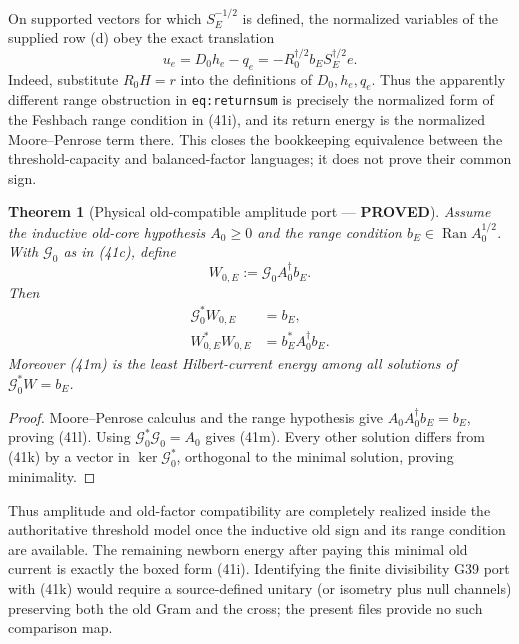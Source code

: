 \documentclass[11pt]{article}
\newtheorem{theorem}{Theorem}
\newcommand{\PROVED}{\textcolor{green!45!black}{\textbf{PROVED}}}
\newcommand{\Ran}{\operatorname{Ran}}
\begin{document}
On supported vectors for which $S_E^{-1/2}$ is defined, the normalized
variables of the supplied row (d) obey the exact translation
\begin{equation}
 u_e=D_0h_e-q_e
 =-R_0^{\dagger/2}b_ES_E^{\dagger/2}e.                \tag{41j}
\end{equation}
Indeed, substitute $R_0H=r$ into the definitions of $D_0,h_e,q_e$.  Thus the
apparently different range obstruction in \texttt{eq:returnsum} is precisely
the normalized form of the Feshbach range condition in (41i), and its return
energy is the normalized Moore--Penrose term there.  This closes the
bookkeeping equivalence between the threshold-capacity and balanced-factor
languages; it does not prove their common sign.

\begin{theorem}[Physical old-compatible amplitude port --- \PROVED]
Assume the inductive old-core hypothesis $A_0\ge0$ and the range condition
$b_E\in\Ran A_0^{1/2}$.  With $\mathcal G_0$ as in (41c), define
\begin{equation}
 W_{0,E}:=\mathcal G_0A_0^\dagger b_E.                 \tag{41k}
\end{equation}
Then
\begin{align}
 \mathcal G_0^*W_{0,E}&=b_E,                           \tag{41l}\\
 W_{0,E}^*W_{0,E}&=b_E^*A_0^\dagger b_E.              \tag{41m}
\end{align}
Moreover (41m) is the least Hilbert-current energy among all solutions of
$\mathcal G_0^*W=b_E$.
\end{theorem}

\begin{proof}
Moore--Penrose calculus and the range hypothesis give
$A_0A_0^\dagger b_E=b_E$, proving (41l).  Using
$\mathcal G_0^*\mathcal G_0=A_0$ gives (41m).  Every other solution differs
from (41k) by a vector in $\ker\mathcal G_0^*$, orthogonal to the minimal
solution, proving minimality.
\end{proof}

Thus amplitude and old-factor compatibility are completely realized inside
the authoritative threshold model once the inductive old sign and its range
condition are available.  The remaining newborn energy after paying this
minimal old current is exactly the boxed form (41i).  Identifying the finite
divisibility G39 port with (41k) would require a source-defined unitary (or
isometry plus null channels) preserving both the old Gram and the cross; the
present files provide no such comparison map.
\end{document}
